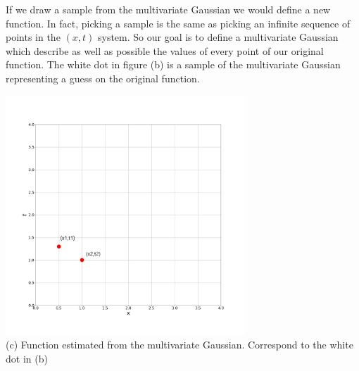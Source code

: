 \documentclass[main.tex]{subfiles}
\begin{document}
If we draw a sample from the multivariate Gaussian we would define a new function. In fact, picking a sample is the same as picking an infinite sequence of points in the $(x,t)$ system. So our goal is to define a multivariate Gaussian which describe as well as possible the values of every point of our original function. The white dot in figure (b) is a sample of the multivariate Gaussian representing a guess on the original function.
\begin{center}
    \includegraphics[width=90mm]{img/SampleGaussianProcesses.jpg} \\
    (c) Function estimated from the multivariate Gaussian. Correspond to the white dot in (b)
\end{center}
\end{document}
